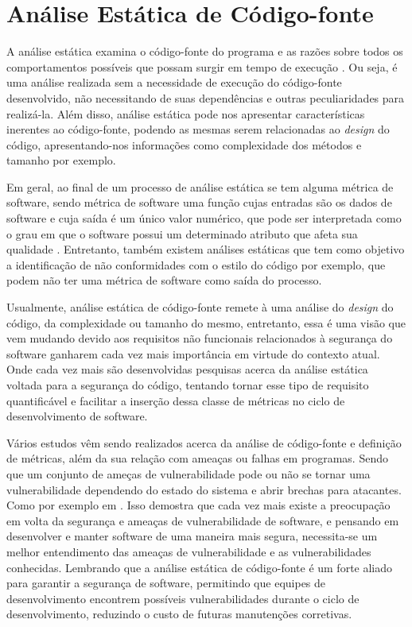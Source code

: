 \chapter{Análise Estática de Código-fonte} \label{chap:analiseestatica}

A análise estática examina o código-fonte do programa e as razões sobre todos os
comportamentos possíveis que possam surgir em tempo de execução
\cite{ernst:2005}. Ou seja, é uma análise realizada sem a necessidade de
execução do código-fonte desenvolvido, não necessitando de suas dependências e
outras peculiaridades para realizá-la. Além disso, análise estática pode nos apresentar
características inerentes ao código-fonte, podendo as mesmas serem relacionadas
ao \textit{design} do código, apresentando-nos informações como complexidade dos
métodos e tamanho por exemplo.

Em geral, ao final de um processo de análise estática se tem alguma métrica de
software, sendo métrica de software uma função cujas entradas são os dados de
software e cuja saída é um único valor numérico, que pode ser interpretada como
o grau em que o software possui um determinado atributo que afeta sua qualidade
\cite{ieee:1061}. Entretanto, também existem análises estáticas que tem como
objetivo a identificação de não conformidades com o estilo do código por exemplo,
que podem não ter uma métrica de software como saída do processo.

Usualmente, análise estática de código-fonte remete à uma análise do
\textit{design} do código, da complexidade ou tamanho do mesmo, entretanto, essa
é uma visão que vem mudando devido aos requisitos não funcionais relacionados à
segurança do software ganharem cada vez mais importância em virtude do contexto
atual. Onde cada vez mais são desenvolvidas pesquisas acerca da análise estática
voltada para a segurança do código, tentando tornar esse tipo de requisito
quantificável e facilitar a inserção dessa classe de métricas no ciclo de
desenvolvimento de software.

Vários estudos vêm sendo realizados acerca da análise de código-fonte e
definição de métricas, além da sua relação com ameaças ou falhas em programas.
Sendo que um conjunto de ameças de vulnerabilidade pode ou não se tornar uma
vulnerabilidade dependendo do estado do sistema e abrir brechas para atacantes.
Como por exemplo em .
Isso demostra que cada vez mais existe a preocupação em volta da segurança e
ameaças de vulnerabilidade de software, e pensando em desenvolver e manter
software de uma maneira mais segura, necessita-se um melhor entendimento das
ameaças de vulnerabilidade e as vulnerabilidades conhecidas. Lembrando que a
análise estática de código-fonte é um forte aliado para garantir a segurança de
software, permitindo que equipes de desenvolvimento encontrem possíveis
vulnerabilidades durante o ciclo de desenvolvimento, reduzindo o custo de
futuras manutenções corretivas.

